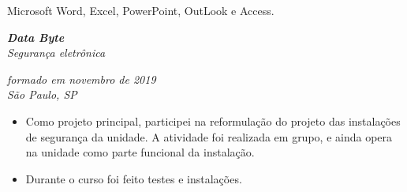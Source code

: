 \documentclass{article}
\begin{document}
Microsoft Word, Excel, PowerPoint, OutLook e Access.


\begin{multicols}{2}
    \noindent
    \begin{flushleft}
        \textbf{\textit{Data Byte}} \\
        \textit{Segurança eletrônica}
    \end{flushleft}
    \columnbreak{}
    \begin{flushright}
        \textit{formado em novembro de 2019} \\
        \textit{São Paulo, SP}
    \end{flushright}
\end{multicols}

\begin{itemize}
    \item Como projeto principal, participei na reformulação do projeto das
        instalações de segurança da unidade. A atividade foi realizada em grupo,
        e ainda opera na unidade como parte funcional da instalação.
    \item Durante o curso foi feito testes e instalações.
\end{itemize}
\end{document}
